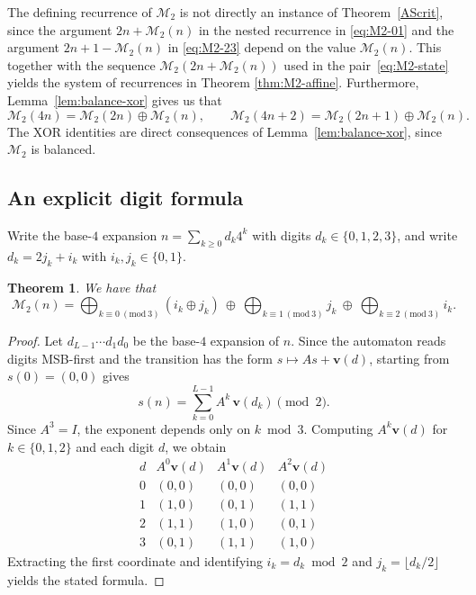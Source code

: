 \documentclass[12pt,reqno]{article}
\theoremstyle{plain}
\newtheorem{theorem}{Theorem}
\theoremstyle{definition}
\theoremstyle{remark}
\begin{document}
 The defining recurrence of $\mathcal{M}_{2}$ is not directly an instance of Theorem~\ref{AScrit}, since the argument $2n + 
 \mathcal{M}_{2}(n)$ in the nested recurrence in \eqref{eq:M2-01} and 
 the argument $2n+1-\mathcal{M}_{2}(n)$ in \eqref{eq:M2-23} depend on the
 value $\mathcal{M}_{2}(n)$. This together with the sequence
 $\mathcal{M}_{2}(2n+\mathcal{M}_{2}(n))$ used in the pair~\eqref{eq:M2-state} yields
 the system of recurrences in Theorem \ref{thm:M2-affine}. 
 Furthermore,
 Lemma~\ref{lem:balance-xor} gives us that 
\[
 \mathcal{M}_{2}(4n) = \mathcal{M}_{2}(2n) \oplus \mathcal{M}_{2}(n), \qquad
 \mathcal{M}_{2}(4n+2) = \mathcal{M}_{2}(2n+1) \oplus \mathcal{M}_{2}(n).
\]
 The XOR identities are direct consequences of Lemma~\ref{lem:balance-xor}, since
 $\mathcal{M}_{2}$ is balanced. 

\subsection{An explicit digit formula}
Write the base-$4$ expansion $n=\sum_{k\ge 0} d_k 4^k$ with digits $d_k\in\{0,1,2,3\}$, and write $d_k=2j_k+i_k$ with $i_k,j_k\in\{0,1\}$.

\begin{theorem}\label{thm:M2-closed} 
 We have that 
$$
\mathcal{M}_{2}(n)=\bigoplus_{ k \equiv 0\ (\mathrm{mod}\ 3) } (i_k\oplus j_k)\ \oplus\ \bigoplus_{ 
 k \equiv 1\ (\mathrm{mod}\ 3)
 } j_k\ \oplus\ \bigoplus_{k\equiv 2\ (\mathrm{mod}\ 3)} i_k.
$$
\end{theorem}

\begin{proof}
 Let $d_{L-1}\cdots d_1 d_0$ be the base-$4$ expansion of $n$. Since the automaton reads
 digits MSB-first and the transition has the form $s\mapsto As+\mathbf{v}(d)$, starting
 from $s(0)=(0,0)$ gives
\[
 s(n) = \sum_{k=0}^{L-1} A^{k}\, \mathbf{v}(d_k) \pmod{2}.
\]
 Since $A^3=I$, the exponent depends only on $k \bmod 3$. Computing $A^k\mathbf{v}(d)$ for
 $k\in\{0,1,2\}$ and each digit $d$, we obtain
\[
\begin{array}{c|ccc}
 d & A^0\mathbf{v}(d) & A^1\mathbf{v}(d) & A^2\mathbf{v}(d) \\ \hline
 0 & (0,0) & (0,0) & (0,0) \\
 1 & (1,0) & (0,1) & (1,1) \\
 2 & (1,1) & (1,0) & (0,1) \\
 3 & (0,1) & (1,1) & (1,0)
\end{array}
\]
Extracting the first coordinate and identifying $i_k = d_k \bmod 2$ and $j_k = \lfloor d_k/2 \rfloor$ yields the stated formula.
\end{proof}
\end{document}
